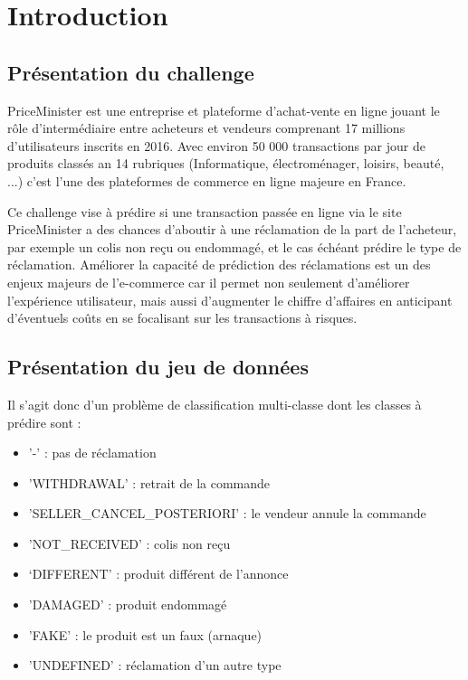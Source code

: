 
\chapter{Introduction}

\section{Présentation du challenge}

PriceMinister est une entreprise et plateforme d'achat-vente en ligne jouant le rôle 
d'intermédiaire entre acheteurs et vendeurs comprenant 17 millions d'utilisateurs inscrits
en 2016. Avec environ 50 000 transactions par jour de produits classés an 14 rubriques 
(Informatique, électroménager, loisirs, beauté, ...) c'est l'une des plateformes de commerce
en ligne majeure en France. 

Ce challenge vise à prédire si une transaction passée en ligne via le site PriceMinister
a des chances d'aboutir à une réclamation de la part de l'acheteur, par exemple un colis 
non reçu ou endommagé, et le cas échéant prédire le type de réclamation. Améliorer la 
capacité de prédiction des réclamations est un des enjeux majeurs de l'e-commerce car il 
permet non seulement d'améliorer l'expérience utilisateur, mais aussi d'augmenter le chiffre 
d'affaires en anticipant d'éventuels coûts en se focalisant sur les transactions à risques.

\section{Présentation du jeu de données}

Il s'agit donc d'un problème de classification multi-classe dont les classes à prédire sont :

\begin{itemize}
\item '-' : pas de réclamation
\item 'WITHDRAWAL' : retrait de la commande
\item 'SELLER_CANCEL_POSTERIORI' : le vendeur annule la commande
\item 'NOT_RECEIVED' : colis non reçu
\item ‘DIFFERENT' : produit différent de l'annonce
\item 'DAMAGED' : produit endommagé
\item 'FAKE' : le produit est un faux (arnaque)
\item 'UNDEFINED' : réclamation d'un autre type
\end{itemize}

